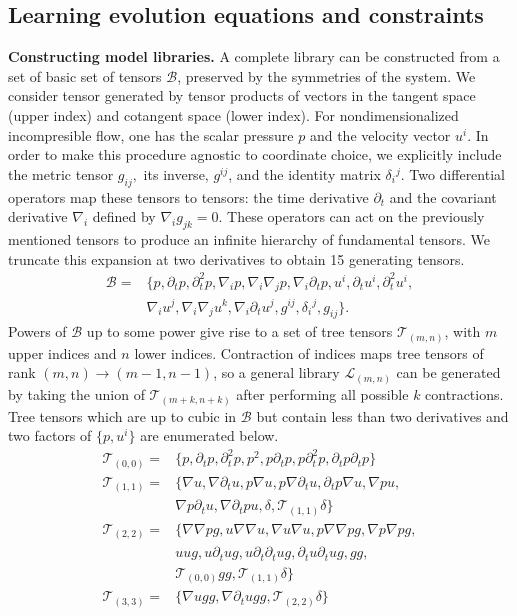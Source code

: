 \documentclass[
 reprint,
 amsmath,amssymb,
 aps,
]{revtex4-2}
\begin{document}
\subsection*{Learning evolution equations and constraints}
{\bf Constructing model libraries.} A complete library can be constructed from a set of basic set of tensors $\mathcal{B}$, preserved by the symmetries of the system. We consider tensor generated by tensor products of vectors in the tangent space (upper index) and cotangent space (lower index). For nondimensionalized incompresible flow, one has the scalar pressure $p$ and the velocity vector $u^i$. In order to make this procedure agnostic to coordinate choice, we explicitly include the metric tensor $g_{ij},$ its inverse, $g^{ij}$, and the identity matrix $\delta_i{}^j$. Two differential operators map these tensors to tensors: the time derivative $\partial_t$ and the covariant derivative $\nabla_i$ defined by $\nabla_i g_{jk} = 0.$ These operators can act on the previously mentioned tensors to produce an infinite hierarchy of fundamental tensors. We truncate this expansion at two derivatives to obtain 15 generating tensors.
\begin{align}
    \mathcal{B} = &\{ p, \partial_t p, \partial_t^2 p, \nabla_i p, \nabla_i \nabla_j p, \nabla_i \partial_t p, u^i, \partial_t u^i, \partial_t^2 u^i, \nonumber \\ 
    &\nabla_i u^j, \nabla_i \nabla_j u^k, \nabla_i \partial_t u^j, g^{ij}, \delta_i{}^j, g_{ij}\}.
\end{align}
Powers of $\mathcal{B}$ up to some power give rise to a set of tree tensors $\mathcal{T}_{(m,n)}$, with $m$ upper indices and $n$ lower indices. Contraction of indices maps tree tensors of rank $(m,n) \rightarrow (m-1,n-1)$, so a general library $\mathcal{L}_{(m,n)}$ can be generated by taking the union of $\mathcal{T}_{(m+k,n+k)}$ after performing all possible $k$ contractions. Tree tensors which are up to cubic in $\mathcal{B}$ but contain less than two derivatives and two factors of $\{p,u^i\}$ are enumerated below.
\begin{align}
    \mathcal{T}_{(0,0)} = &\{ p , \partial_t p , \partial_t^2 p ,  p^2,  p \partial_t p ,  p \partial_t^2 p , \partial_t p \partial_t p \}\\
    \mathcal{T}_{(1,1)} = &\{ \nabla u , \nabla \partial_t u ,  p \nabla u ,  p \nabla \partial_t u , \partial_t p \nabla u , \nabla p  u , \nonumber \\
    &\nabla p \partial_t u , \nabla \partial_t p  u ,\delta, \mathcal{T}_{(1,1)} \delta \}\\
    \mathcal{T}_{(2,2)} = & \{ \nabla \nabla p g ,  u \nabla \nabla u , \nabla u \nabla u ,  p \nabla \nabla p g, \nabla p \nabla p g , \nonumber \\
    & u u g ,  u \partial_t u g ,  u \partial_t \partial_t u g , \partial_t u \partial_t u g, gg, \nonumber \\
    &\mathcal{T}_{(0,0)} gg, \mathcal{T}_{(1,1)}\delta\}\\
    \mathcal{T}_{(3,3)} = & \{ \nabla u g g , \nabla \partial_t u g g , \mathcal{T}_{(2,2)} \delta \}
\end{align}
\end{document}
